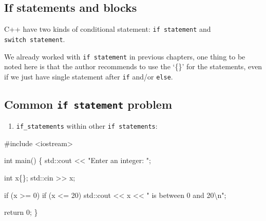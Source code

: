 \documentclass[
  letterpaper,
  DIV=11,
  numbers=noendperiod]{scrreprt}
\newenvironment{Shaded}{\begin{snugshade}}{\end{snugshade}}
\newcommand{\CommentTok}[1]{\textcolor[rgb]{0.37,0.37,0.37}{#1}}
\newcommand{\ControlFlowTok}[1]{\textcolor[rgb]{0.00,0.23,0.31}{#1}}
\newcommand{\DecValTok}[1]{\textcolor[rgb]{0.68,0.00,0.00}{#1}}
\newcommand{\ErrorTok}[1]{\textcolor[rgb]{0.68,0.00,0.00}{#1}}
\newcommand{\FunctionTok}[1]{\textcolor[rgb]{0.28,0.35,0.67}{#1}}
\newcommand{\NormalTok}[1]{\textcolor[rgb]{0.00,0.23,0.31}{#1}}
\newcommand{\SpecialCharTok}[1]{\textcolor[rgb]{0.37,0.37,0.37}{#1}}
\newcommand{\StringTok}[1]{\textcolor[rgb]{0.13,0.47,0.30}{#1}}
\providecommand{\tightlist}{%
  \setlength{\itemsep}{0pt}\setlength{\parskip}{0pt}}\usepackage{longtable,booktabs,array}
\begin{document}
\hypertarget{if-statements-and-blocks}{%
\subsection{If statements and blocks}\label{if-statements-and-blocks}}

C++ have two kinds of conditional statement: \texttt{if\ statement} and
\texttt{switch\ statement}.

We already worked with \texttt{if\ statement} in previous chapters, one
thing to be noted here is that the author recommends to use the `\{\}'
for the statements, even if we just have single statement after
\texttt{if} and/or \texttt{else}.

\hypertarget{common-if-statement-problem}{%
\subsection{\texorpdfstring{Common \texttt{if\ statement}
problem}{Common if statement problem}}\label{common-if-statement-problem}}

\begin{enumerate}
\def\labelenumi{\arabic{enumi}.}
\tightlist
\item
  \texttt{if\_statements} within other \texttt{if\ statements}:
\end{enumerate}

\begin{Shaded}
\begin{Highlighting}[]
\CommentTok{\#include \textless{}iostream\textgreater{}}

\NormalTok{int }\FunctionTok{main}\NormalTok{()}
\NormalTok{\{}
\NormalTok{    std}\SpecialCharTok{::}\NormalTok{cout }\SpecialCharTok{\textless{}}\ErrorTok{\textless{}} \StringTok{"Enter an integer: "}\NormalTok{;}

\NormalTok{    int x\{\};}
\NormalTok{    std}\SpecialCharTok{::}\NormalTok{cin }\SpecialCharTok{\textgreater{}}\ErrorTok{\textgreater{}}\NormalTok{ x;}

    \ControlFlowTok{if}\NormalTok{ (x }\SpecialCharTok{\textgreater{}=} \DecValTok{0}\NormalTok{)}
        \ControlFlowTok{if}\NormalTok{ (x }\SpecialCharTok{\textless{}=} \DecValTok{20}\NormalTok{)}
\NormalTok{            std}\SpecialCharTok{::}\NormalTok{cout }\SpecialCharTok{\textless{}}\ErrorTok{\textless{}}\NormalTok{ x }\SpecialCharTok{\textless{}}\ErrorTok{\textless{}} \StringTok{" is between 0 and 20}\SpecialCharTok{\textbackslash{}n}\StringTok{"}\NormalTok{;}

\NormalTok{    return }\DecValTok{0}\NormalTok{;}
\NormalTok{\}}
\end{Highlighting}
\end{Shaded}
\end{document}
